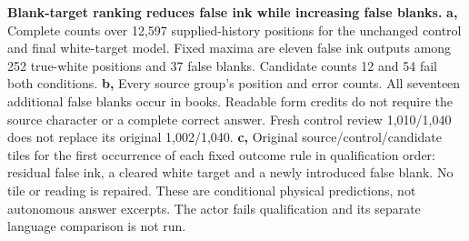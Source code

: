 \textbf{Blank-target ranking reduces false ink while increasing false blanks.}
\textbf{a,} Complete counts over 12,597 supplied-history positions for the
unchanged control and final white-target model. Fixed maxima are eleven false
ink outputs among 252 true-white positions and 37 false blanks. Candidate counts
12 and 54 fail both conditions. \textbf{b,} Every source group's position and
error counts. All seventeen additional false blanks occur in books. Readable
form credits do not require the source character or a complete correct answer.
Fresh control review 1,010/1,040 does not replace its original 1,002/1,040.
\textbf{c,} Original source/control/candidate tiles for the first occurrence of
each fixed outcome rule in qualification order: residual false ink, a cleared
white target and a newly introduced false blank. No tile or reading is repaired.
These are conditional physical predictions, not autonomous answer excerpts.
The actor fails qualification and its separate language comparison is not run.
